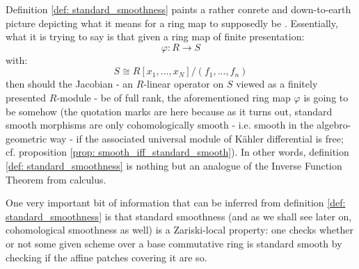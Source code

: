             \begin{remark} \label{remark: standard_smoothness}
                Definition \ref{def: standard_smoothness} paints a rather conrete and down-to-earth picture depicting what it means for a ring map to supposedly be . Essentially, what it is trying to say is that given a ring map of finite presentation:
                    $$\varphi: R \to S$$
                with:
                    $$S \cong R[x_1, ..., x_N]/(f_1, ..., f_n)$$
                then should the Jacobian - an $R$-linear operator on $S$ viewed as a finitely presented $R$-module - be of full rank, the aforementioned ring map $\varphi$ is going to be somehow  (the quotation marks are here because as it turns out, standard smooth morphisms are only cohomologically smooth - i.e. smooth in the  algebro-geometric way - if the associated universal module of K\"ahler differential is free; cf. proposition \ref{prop: smooth_iff_standard_smooth}). In other words, definition \ref{def: standard_smoothness} is nothing but an analogue of the Inverse Function Theorem from calculus. 
            \end{remark}
            \begin{remark}
                One very important bit of information that can be inferred from definition \ref{def: standard_smoothness} is that standard smoothness (and as we shall see later on, cohomological smoothness as well) is a Zariski-local property: one checks whether or not some given scheme over a base commutative ring is standard smooth by checking if the affine patches covering it are so. 
            \end{remark}
            
